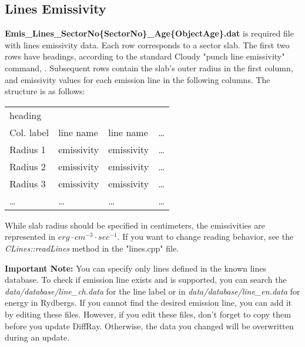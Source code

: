 \documentclass[a4paper]{article}
\begin{document}
\subsection{Lines Emissivity}
{\bf Emis\_Lines\_SectorNo\{SectorNo\}\_Age\{ObjectAge\}.dat} is required file with lines emissivity data.
Each row corresponds to a sector slab. The first two rows have headings, according to the standard
Cloudy "punch line emissivity" command, \cite{Cloudy}.
Subsequent rows contain the slab's outer radius in the first column, and emissivity values for each emission line in the following columns.
The structure is as follows:
\begin{table}[H]
    \begin{tabular}{llll}
        heading & & & \\
        Col. label & line name & line name & \ldots \\
        Radius 1 & emissivity & emissivity & \ldots \\
        Radius 2 & emissivity & emissivity & \ldots \\
        Radius 3 & emissivity & emissivity & \ldots \\
        \ldots & \ldots & \ldots & \ldots \\
    \end{tabular}
\end{table}
While slab radius should be specified in centimeters, the emissivities are represented in $erg \cdot cm^{-3} \cdot sec^{-1}$.
If you want to change reading behavior, see the {\it CLines::readLines} method in the "lines.cpp" file.

    {\bf Important Note:} You can specify only lines defined in the known lines database.
To check if emission line exists and is supported, you can search the {\it data/database/line\_ch.data} for the line label
or in {\it data/database/line\_en.data} for energy in Rydbergs.
If you cannot find the desired emission line, you can add it by editing these files.
However, if you edit these files, don't forget to copy them before you update DiffRay.
Otherwise, the data you changed will be overwritten during an update.
\end{document}
